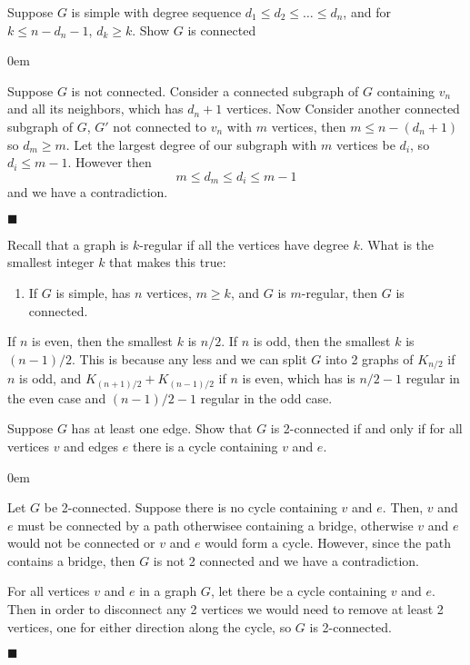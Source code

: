 \documentclass[12pt]{article}
\author{Warren Atkison}
\date{\today}
\renewcommand{\qed}{\hfill$\blacksquare$}
\renewenvironment{proof}{\vspace{1em}\begin{addmargin}[2em]{0em}\begin{newproof}}{\end{newproof}\end{addmargin}\qed}
\newenvironment{exercise}[2][Exercise]{\begin{trivlist}
\item[\hskip \labelsep {\bfseries #1} \hskip \labelsep {\bfseries #2.}]}{\end{trivlist}}
\begin{document}
\fancyhf{}
\fancyhead[R]{\today}
\fancyfoot[R]{\thepage}

\begin{exercise}{5.7.3 (2pt)}
	Suppose $G$ is simple with degree sequence $d_1 \le d_2 \le \ldots \le d_n$, and for $k \le n - d_n - 1$, $d_k \ge k$. Show $G$ is connected
\end{exercise}

\begin{proof}
	Suppose $G$ is not connected. Consider a connected subgraph of $G$ containing $v_n$ and all its neighbors, which has $d_n + 1$ vertices. Now Consider another connected subgraph of $G$, $G'$ not connected to $v_n$ with $m$ vertices, then $m \le n - (d_n + 1)$ so $d_m \ge m$. Let the largest degree of our subgraph with $m$ vertices be $d_i$, so $d_i \le m - 1$. However then
	\[
		m \le d_m \le d_i \le m - 1
	\]
	and we have a contradiction.
\end{proof}
\begin{exercise}{5.7.4 (2pt)}
	Recall that a graph is $k$-regular if all the vertices have degree $k$. What is the smallest integer $k$ that makes this true:
	\begin{enumerate}
		\item[] If $G$ is simple, has $n$ vertices, $m \ge k$, and $G$ is $m$-regular, then $G$ is connected.
	\end{enumerate}
\end{exercise}	
If $n$ is even, then the smallest $k$ is $n/2$. If $n$ is odd, then the smallest $k$ is $(n-1)/2$. This is because any less and we can split $G$ into 2 graphs of $K_{n/2}$ if $n$ is odd, and $K_{(n+1)/2} + K_{(n-1)/2}$ if $n$ is even, which has is $n/2 - 1$ regular in the even case and $(n-1)/2 - 1$ regular in the odd case.
\begin{exercise}{5.7.5 (2pt)}
	Suppose $G$ has at least one edge. Show that $G$ is 2-connected if and only if for all vertices $v$ and edges $e$ there is a cycle containing $v$ and $e$.
\end{exercise}	
\begin{proof}
	Let $G$ be 2-connected. Suppose there is no cycle containing $v$ and $e$. Then, $v$ and $e$ must be connected by a path otherwisee containing a bridge, otherwise $v$ and $e$ would not be connected or $v$ and $e$ would form a cycle. However, since the path contains a bridge, then $G$ is not 2 connected and we have a contradiction.

	For all vertices $v$ and $e$ in a graph $G$, let there be a cycle containing $v$ and $e$. Then in order to disconnect any 2 vertices we would need to remove at least 2 vertices, one for either direction along the cycle, so $G$ is 2-connected.
\end{proof}
\end{document}
